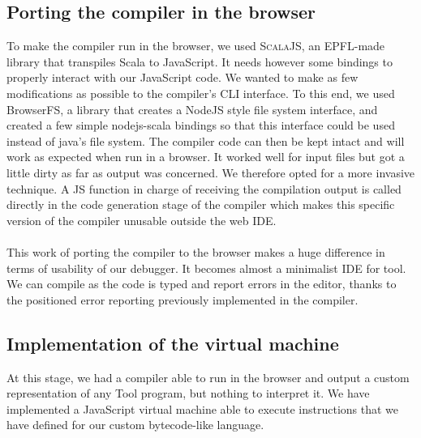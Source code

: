 


\subsection{Porting the compiler in the browser}

To make the compiler run in the browser, we used \textsc{ScalaJS}, an EPFL-made library that transpiles Scala to JavaScript.
It needs however some bindings to properly interact with our JavaScript code. We wanted to make as few modifications as possible to the compiler's CLI interface. To this end, we used BrowserFS, a library that creates a NodeJS style file system interface, and created a few simple nodejs-scala bindings so that this interface could be used instead of java's file system. The compiler code can then be kept intact and will work as expected when run in a browser. It worked well for input files but got a little dirty as far as output was concerned. We therefore opted for a more invasive technique. A JS function in charge of receiving the compilation output is called directly in the code generation stage of the compiler which makes this specific version of the compiler unusable outside the web IDE.

\paragraph{}
This work of porting the compiler to the browser makes a huge difference in terms of usability of our debugger. It becomes almost a minimalist IDE for tool. We can compile as the code is typed and report errors in the editor, thanks to the positioned error reporting previously implemented in the compiler.

\subsection{Implementation of the virtual machine}

At this stage, we had a compiler able to run in the browser and output a custom representation of any Tool program, but nothing to interpret it.
We have implemented a JavaScript virtual machine able to execute instructions that we have defined for our custom bytecode-like language.

